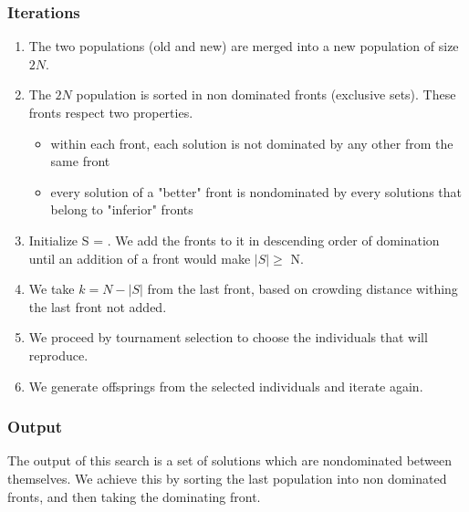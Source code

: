 \documentclass[a4paper, 12pt] {article}
\begin{document}
\subsubsection*{Iterations}
\begin{enumerate}
  \item The two populations (old and new) are merged into a new population of size $2N$.
  \item The $2N$ population is sorted in non dominated fronts (exclusive sets). These fronts respect two properties.	
  \begin{itemize}
    \item within each front, each solution is not dominated by any other from the same front
    \item every solution of a "better" front is nondominated by every solutions that belong to "inferior" fronts
  \end{itemize}
  \item Initialize S = {}. We add the fronts to it in descending order of domination until an addition of a front would make $\left\vert{S}\right\vert \geq$ N. 
  \item We take $k = N - \left\vert{S}\right\vert $ from the last front, based on crowding distance withing the last front not added.
  \item We proceed by tournament selection to choose the individuals that will reproduce.
  \item We generate offsprings from the selected individuals and iterate again.
\end{enumerate}
\subsubsection*{Output}
The output of this search is a set of solutions which are nondominated between themselves. We achieve this by 
sorting the last population into non dominated fronts, and then taking the dominating front.

%     
\end{document}
